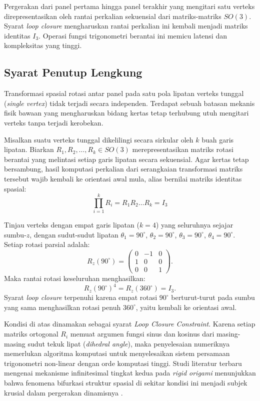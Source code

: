 Pergerakan dari panel pertama hingga panel terakhir yang mengitari satu verteks direpresentasikan oleh rantai perkalian sekuensial dari matriks-matriks $SO(3)$. Syarat \textit{loop closure} mengharuskan rantai perkalian ini kembali menjadi matriks identitas $I_3$. Operasi fungsi trigonometri berantai ini memicu latensi dan kompleksitas yang tinggi.

\subsection{Syarat Penutup Lengkung}
Transformasi spasial rotasi antar panel pada satu pola lipatan verteks tunggal (\textit{single vertex}) tidak terjadi secara independen. Terdapat sebuah batasan mekanis fisik bawaan yang mengharuskan bidang kertas tetap terhubung utuh mengitari verteks tanpa terjadi kerobekan.

\begin{teorema}
  Misalkan suatu verteks tunggal dikelilingi secara sirkular oleh $k$ buah garis lipatan. Biarkan $R_1, R_2, \ldots, R_k \in SO(3)$ merepresentasikan matriks rotasi berantai yang melintasi setiap garis lipatan secara sekuensial. Agar kertas tetap bersambung, hasil komputasi perkalian dari serangkaian transformasi matriks tersebut wajib kembali ke orientasi awal mula, alias bernilai matriks identitas spasial:
  \[
    \prod_{i=1}^{k} R_i = R_1 R_2 \ldots R_k = I_3
  \]
\end{teorema}

\begin{contoh}
  Tinjau verteks dengan empat garis lipatan ($k = 4$) yang seluruhnya sejajar sumbu-$z$, dengan sudut-sudut lipatan $\theta_1 = 90^\circ$, $\theta_2 = 90^\circ$, $\theta_3 = 90^\circ$, $\theta_4 = 90^\circ$. Setiap rotasi parsial adalah:
  \[
    R_z(90^\circ) = \begin{pmatrix} 0 & -1 & 0 \\ 1 & 0 & 0 \\ 0 & 0 & 1 \end{pmatrix}.
  \]
  Maka rantai rotasi keseluruhan menghasilkan:
  \[
    R_z(90^\circ)^4 = R_z(360^\circ) = I_3.
  \]
  Syarat \textit{loop closure} terpenuhi karena empat rotasi $90^\circ$ berturut-turut pada sumbu yang sama menghasilkan rotasi penuh $360^\circ$, yaitu kembali ke orientasi awal.
\end{contoh}

Kondisi di atas dinamakan sebagai syarat \textit{Loop Closure Constraint}. Karena setiap matriks ortogonal $R_i$ memuat argumen fungsi sinus dan kosinus dari masing-masing sudut tekuk lipat (\textit{dihedral angle}), maka penyelesaian numeriknya memerlukan algoritma komputasi untuk menyelesaikan sistem persamaan trigonometri non-linear dengan orde komputasi tinggi. Studi literatur terbaru mengenai mekanisme infinitesimal tingkat kedua pada \textit{rigid origami} menunjukkan bahwa fenomena bifurkasi struktur spasial di sekitar kondisi ini menjadi subjek krusial dalam pergerakan dinamisnya \parencite{hayakawa2023analytical, hayakawa2024rigid}.

